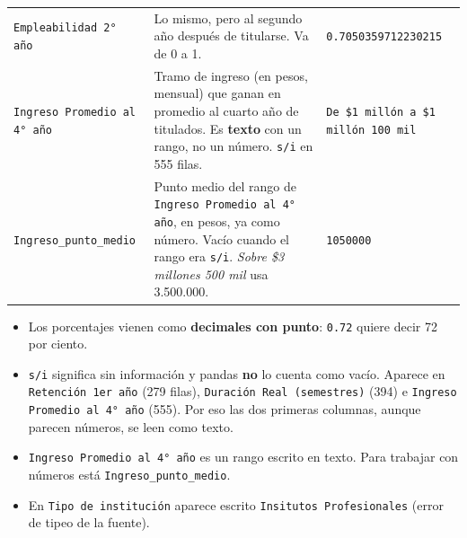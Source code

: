 \documentclass[10.5pt]{article}
\begin{document}
\begin{xltabular}{\linewidth}{@{}p{4.5cm} >{\raggedright\arraybackslash}X p{3.4cm}@{}}
\texttt{Empleabilidad 2° año} & Lo mismo, pero al segundo año después de titularse. Va de 0 a 1. & \texttt{0.7050359712230215} \\
\texttt{Ingreso Promedio al 4° año} & Tramo de ingreso (en pesos, mensual) que ganan en promedio al cuarto año de titulados. Es \textbf{texto} con un rango, no un número. \texttt{s/\allowbreak{}i} en 555 filas. & \texttt{De \$1 millón a \$1 millón 100 mil} \\
\texttt{Ingreso\_\allowbreak{}punto\_\allowbreak{}medio} & Punto medio del rango de \texttt{Ingreso Promedio al 4° año}, en pesos, ya como número. Vacío cuando el rango era \texttt{s/\allowbreak{}i}. \emph{Sobre \$3 millones 500 mil} usa 3.500.000. & \texttt{1050000} \\
\end{xltabular}

\begin{alertabox}
\begin{itemize}[leftmargin=1.1em,itemsep=2pt,topsep=2pt]
\item Los porcentajes vienen como \textbf{decimales con punto}: \texttt{0.72} quiere decir 72 por ciento.
\item \texttt{s/\allowbreak{}i} significa sin información y pandas \textbf{no} lo cuenta como vacío. Aparece en \texttt{Retención 1er año} (279 filas), \texttt{Duración Real (semestres)} (394) e \texttt{Ingreso Promedio al 4° año} (555). Por eso las dos primeras columnas, aunque parecen números, se leen como texto.
\item \texttt{Ingreso Promedio al 4° año} es un rango escrito en texto. Para trabajar con números está \texttt{Ingreso\_\allowbreak{}punto\_\allowbreak{}medio}.
\item En \texttt{Tipo de institución} aparece escrito \texttt{Insitutos Profesionales} (error de tipeo de la fuente).
\end{itemize}
\end{alertabox}

\newpage
{}\label{base2}\hypertarget{base2}{}
\end{document}
